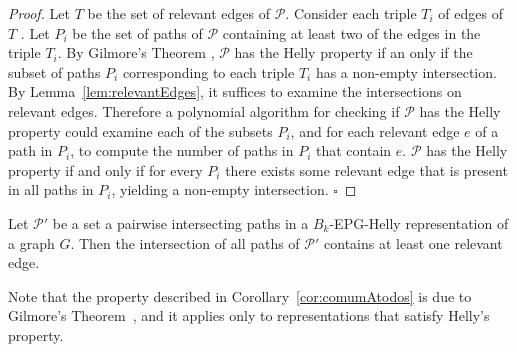 \documentclass[runningheads]{llncs}
\begin{document}
\begin{proof}
Let $T$ be the set of relevant edges of $\mathcal{P}$. Consider each triple $T_i$ of edges of $T$ . Let $P_i$ be the set of paths of $\mathcal{P}$ containing at least two of the edges in the triple  $T_i$. By Gilmore’s Theorem \cite{bergeDuchet1975}, $\mathcal{P}$ has the Helly property if an only if the subset of paths $P_i$  corresponding to each triple  $T_i$  has a non-empty intersection.  By Lemma~\ref{lem:relevantEdges}, it suffices to examine the intersections on relevant edges. Therefore a polynomial algorithm for checking if $\mathcal{P}$ has the Helly property could examine each of the subsets $P_i$, and for each relevant edge $e$ of a path in $P_i$, to compute the number of paths in $P_i$ that contain $e$. $\mathcal{P}$ has the Helly property if and only if for every  $P_i$  there exists some relevant edge that is present in all paths in $P_i$,  yielding a non-empty intersection.
$\square$ \end{proof}


\begin{corollary}\label{cor:comumAtodos}
Let ${\mathcal P'}$ be a set a pairwise intersecting paths in a $B_k$-EPG-Helly representation of a graph $G$. Then the intersection of all paths of  ${\mathcal P'}$ contains at least one relevant edge.
\end{corollary}

Note that the property described in Corollary~\ref{cor:comumAtodos} is due to Gilmore's Theorem~\cite{bergeDuchet1975}, and it applies only to representations that satisfy Helly's property.

\medskip


\end{document}
